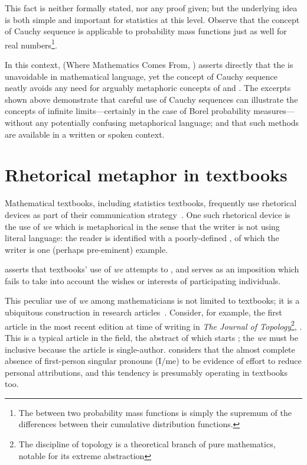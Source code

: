   \noindent
This fact is neither formally stated, nor any proof given; but the
underlying idea is both simple and important for statistics at this
level.  Observe that the concept of Cauchy sequence is applicable to
probability mass functions just as well for real numbers\footnote{The
   between two probability mass functions is simply
  the supremum of the differences between their cumulative
  distribution functions.}.

In this context, \wmcf (Where Mathematics Comes From,
\cite{lakoff2000}) asserts directly that the \bmi is unavoidable in
mathematical language, yet the concept of Cauchy sequence neatly
avoids any need for arguably metaphoric concepts of  and
.  The excerpts shown above demonstrate that
careful use of Cauchy sequences can illustrate the concepts of
infinite limits---certainly in the case of Borel probability
measures---without any potentially confusing metaphorical language;
and that such methods are available in a written or spoken context.

\section{Rhetorical \label{we_start} metaphor in textbooks}

Mathematical textbooks, including statistics textbooks, frequently use
rhetorical devices as part of their communication
strategy~\citep{kane1970}.  One such rhetorical device is the use of
\emph{we} which is metaphorical in the sense that the writer is not
using literal language: the reader is identified with a poorly-defined
, of which the writer is one (perhaps
pre-eminent) example.

\cite{pimm1984} asserts that textbooks' use of \emph{we}
attempts to , and
serves as an imposition which fails to take into account the wishes or
interests of participating individuals.

This peculiar use of \emph{we} among mathematicians is not limited to
textbooks; it is a ubiquitous construction in research
articles~\parencite{kuo1999}.  Consider, for example, the first
article in the most recent edition at time of writing in \emph{The
  Journal of Topology}\footnote{The discipline of topology is a
  theoretical branch of pure mathematics, notable for its extreme
  abstraction}, \parencite{lange2016}. This is a typical article in
the field, the abstract of which starts ; the \emph{we} must be
inclusive because the article is single-author.  
considers that the almost complete absence of first-person singular
pronouns (I/me) to be evidence of effort to reduce personal
attributions, and this tendency is presumably operating in textbooks
too.

